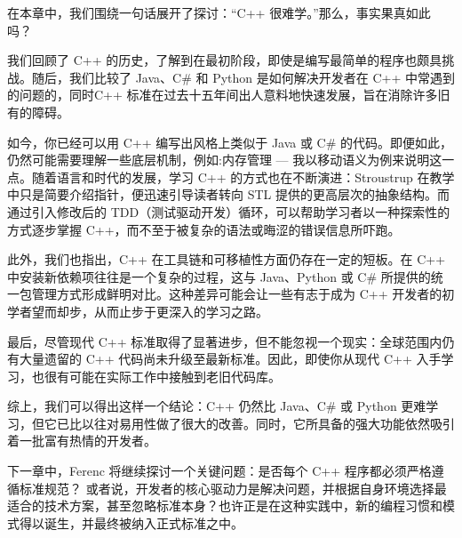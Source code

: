 在本章中，我们围绕一句话展开了探讨：“C++ 很难学。”那么，事实果真如此吗？

我们回顾了 C++ 的历史，了解到在最初阶段，即使是编写最简单的程序也颇具挑战。随后，我们比较了 Java、C\# 和 Python 是如何解决开发者在 C++ 中常遇到的问题的，同时C++ 标准在过去十五年间出人意料地快速发展，旨在消除许多旧有的障碍。

如今，你已经可以用 C++ 编写出风格上类似于 Java 或 C\# 的代码。即便如此，仍然可能需要理解一些底层机制，例如:内存管理 --- 我以移动语义为例来说明这一点。随着语言和时代的发展，学习 C++ 的方式也在不断演进：Stroustrup 在教学中只是简要介绍指针，便迅速引导读者转向 STL 提供的更高层次的抽象结构。而通过引入修改后的 TDD（测试驱动开发）循环，可以帮助学习者以一种探索性的方式逐步掌握 C++，而不至于被复杂的语法或晦涩的错误信息所吓跑。

此外，我们也指出，C++ 在工具链和可移植性方面仍存在一定的短板。在 C++ 中安装新依赖项往往是一个复杂的过程，这与 Java、Python 或 C\# 所提供的统一包管理方式形成鲜明对比。这种差异可能会让一些有志于成为 C++ 开发者的初学者望而却步，从而止步于更深入的学习之路。

最后，尽管现代 C++ 标准取得了显著进步，但不能忽视一个现实：全球范围内仍有大量遗留的 C++ 代码尚未升级至最新标准。因此，即使你从现代 C++ 入手学习，也很有可能在实际工作中接触到老旧代码库。

综上，我们可以得出这样一个结论：C++ 仍然比 Java、C\# 或 Python 更难学习，但它已比以往对易用性做了很大的改善。同时，它所具备的强大功能依然吸引着一批富有热情的开发者。

下一章中，Ferenc 将继续探讨一个关键问题：是否每个 C++ 程序都必须严格遵循标准规范？ 或者说，开发者的核心驱动力是解决问题，并根据自身环境选择最适合的技术方案，甚至忽略标准本身？也许正是在这种实践中，新的编程习惯和模式得以诞生，并最终被纳入正式标准之中。